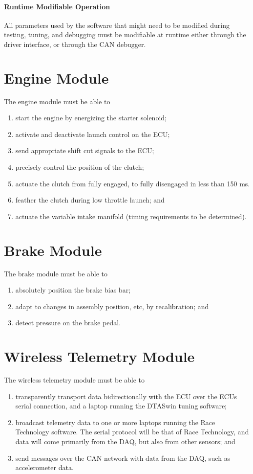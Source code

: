 \paragraph{Runtime Modifiable Operation}
All parameters used by the software that might need to be modified during testing, tuning, and debugging must be modifiable at runtime either through the driver interface, or through the CAN debugger.

\section{Engine Module}
The engine module must be able to
\begin{enumerate}
 \item start the engine by energizing the starter solenoid;
 \item activate and deactivate launch control on the ECU;
 \item send appropriate shift cut signals to the ECU;
 \item precisely control the position of the clutch;
 \item actuate the clutch from fully engaged, to fully disengaged in less than 150 ms.
 \item feather the clutch during low throttle launch; and
 \item actuate the variable intake manifold (timing requirements to be determined).
\end{enumerate}

\section{Brake Module}
The brake module must be able to
\begin{enumerate}
 \item absolutely position the brake bias bar;
 \item adapt to changes in assembly position, etc, by recalibration; and
 \item detect pressure on the brake pedal.
\end{enumerate}

\section{Wireless Telemetry Module}
The wireless telemetry module must be able to
\begin{enumerate}
 \item transparently transport data bidirectionally with the ECU over the ECUs serial
connection, and a laptop running the DTASwin tuning software;
 \item broadcast telemetry data to one or more laptops running the Race Technology
software. The serial protocol will be that of Race Technology, and data will
come primarily from the DAQ, but also from other sensors; and
 \item send messages over the CAN network with data from the DAQ, such as accelerometer data.
\end{enumerate}

